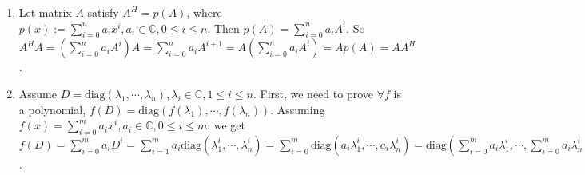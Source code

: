 \documentclass{ctexart}
\newcommand{\diag}{\mathrm{diag}}
\begin{document}
\begin{solution}
 \begin{enumerate}
   \item Let matrix \(A \) satisfy \(A^H = p(A) \), where \(p(x):=\sum_{i=0}^{n}a_ix^i,a_i \in \mathbb{C},0 \leq i \leq n \).
     Then \(p(A)=\sum_{i=0}^{n}a_iA^i \). So \(A^HA=(\sum_{i=0}^{n}a_iA^i)A=\sum_{i=0}^{n}a_iA^{i + 1}=A(\sum_{i=0}^{n}a_iA^i)=Ap(A)=AA^H \).
   \item Assume \(D=\diag(\lambda_1,\cdots,\lambda_n), \lambda_i \in \mathbb{C}, 1 \leq i \leq n  \). 
     First, we need to prove \(\forall f \) is a polynomial, \(f(D)=\diag(f(\lambda_1),\cdots,f(\lambda_n)) \).
     Assuming \(f(x)=\sum_{i=0}^{m}a_ix^i,a_i \in \mathbb{C},0 \leq i \leq m \), we get\( f(D)=\sum_{i=0}^{m}a_iD^i=\sum_{i=1}^{m}a_i \diag(\lambda_1^i,\cdots,\lambda_n^i)=
     \sum_{i=0}^{m}\diag(a_{i}\lambda _1^i,\cdots,a_i \lambda _n^i)=\diag(\sum_{i=0}^{m}a_{i}\lambda _1^i,\cdots,\sum_{i=0}^{m}a_i \lambda _n^i)=\diag(f(\lambda_1),\cdots,f(\lambda_n))\). 
     

\end{enumerate}
\end{solution}
\end{document}
